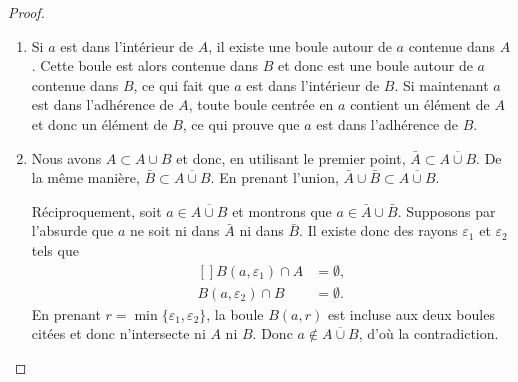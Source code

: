 \begin{proof}
	\begin{enumerate}
		\item
		      Si \( a\) est dans l'intérieur de \( A\), il existe une boule autour de \( a\) contenue dans \( A\). Cette boule est alors contenue dans \( B\) et donc est une boule autour de \( a\) contenue dans \( B\), ce qui fait que \( a\) est dans l'intérieur de \( B\). Si maintenant \( a\) est dans l'adhérence de \( A\), toute boule centrée en \( a\) contient un élément de \( A\) et donc un élément de \( B\), ce qui prouve que \( a\) est dans l'adhérence de \( B\).
		\item
		      Nous avons \( A\subset A\cup B\) et donc, en utilisant le premier point, \( \bar A\subset\overline{ A\cup B }\). De la même manière, \( \bar B\subset\overline{ A\cup B }\). En prenant l'union, \( \bar A\cup\bar B\subset\overline{ A\cup B }\).

		      Réciproquement, soit \( a\in\overline{ A\cup B }\) et montrons que \( a\in\bar A\cup\bar B\). Supposons par l'absurde que \( a\) ne soit ni dans \( \bar A\) ni dans \( \bar B\). Il existe donc des rayons \( \varepsilon_1\) et \( \varepsilon_2\) tels que
		      \begin{equation}
			      \begin{aligned}[]
				      B(a,\varepsilon_1)\cap A & =\emptyset, \\
				      B(a,\varepsilon_2)\cap B & =\emptyset.
			      \end{aligned}
		      \end{equation}
		      En prenant \( r=\min\{ \varepsilon_1,\varepsilon_2 \}\), la boule \( B(a,r)\) est incluse aux deux boules citées et donc n'intersecte ni \( A\) ni \( B\). Donc \( a\notin\overline{ A\cup B }\), d'où la contradiction.


\end{enumerate}
\end{proof}
